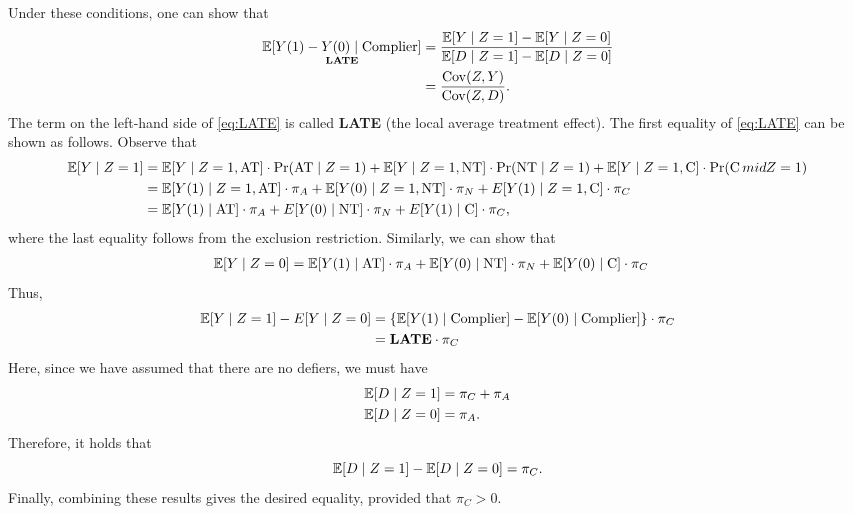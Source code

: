 \documentclass[11pt, A4paper, openany, uplatex]{book}
\begin{document}
Under these conditions, one can show that
\begin{align}\label{eq:LATE}
\begin{split}
	\underset{\text{\bf LATE}}{\mathbb{E}[Y(1) - Y(0) \mid \text{Complier}]} 
	& = \frac{\mathbb{E}[Y \mid Z = 1] - \mathbb{E}[Y \mid Z = 0]}{\mathbb{E}[D \mid Z = 1] - \mathbb{E}[D \mid Z = 0]}\\
	& = \frac{\mathrm{Cov}(Z, Y)}{\mathrm{Cov}(Z, D)}.
\end{split}
\end{align}
The term on the left-hand side of \eqref{eq:LATE} is called \textbf{LATE} (the local average treatment effect).
The first equality of \eqref{eq:LATE} can be shown as follows.
Observe that
\small{\begin{align*}
	\mathbb{E}[Y \mid Z = 1 ] 
	& = \mathbb{E}[Y \mid Z = 1, \text{AT} ] \cdot \Pr(\text{AT} \mid Z = 1) + \mathbb{E}[Y \mid Z = 1, \text{NT} ] \cdot \Pr(\text{NT} \mid Z = 1) + \mathbb{E}[Y \mid Z = 1, \text{C} ] \cdot \Pr(\text{C} \,mid Z = 1)\\
	& = \mathbb{E}[Y(1) \mid Z = 1, \text{AT} ] \cdot \pi_A + \mathbb{E}[Y(0) \mid Z = 1, \text{NT} ] \cdot \pi_N + E[Y(1) \mid Z = 1, \text{C} ] \cdot \pi_C\\
	& = \mathbb{E}[Y(1) \mid \text{AT} ] \cdot \pi_A  + E[Y(0) \mid \text{NT} ] \cdot \pi_N  + E[Y(1) \mid \text{C} ] \cdot \pi_C,
\end{align*}}
\normalsize
where the last equality follows from the exclusion restriction.
Similarly, we can show that
\begin{align*}
	\mathbb{E}[Y \mid Z = 0]
	& = \mathbb{E}[Y(1) \mid \text{AT} ] \cdot \pi_A + \mathbb{E}[ Y(0) \mid \text{NT} ] \cdot \pi_N  + \mathbb{E}[ Y(0) \mid \text{C} ]  \cdot \pi_C
\end{align*}
Thus, 
\begin{align*}
	\mathbb{E} [ Y \mid Z = 1 ] - E[ Y \mid Z = 0 ] 
	&= \left\{ \mathbb{E}[ Y(1) \mid \text{Complier} ] - \mathbb{E}[ Y(0) \mid \text{Complier} ] \right\} \cdot \pi_C\\
	& = \mathbf{LATE}\cdot\pi_C
\end{align*}
Here, since we have assumed that there are no defiers, we must have
\begin{align*}
	\mathbb{E}[ D \mid Z = 1 ]   &  = \pi_C + \pi_A \\
	\mathbb{E}[ D \mid Z = 0 ]   &  = \pi_A.
\end{align*}
Therefore, it holds that
\begin{equation*}
	\mathbb{E} [D \mid Z = 1 ] - \mathbb{E}[ D \mid Z = 0 ] = \pi_C.
\end{equation*}
Finally, combining these results gives the desired equality, provided that $\pi_C > 0$.
\end{document}
